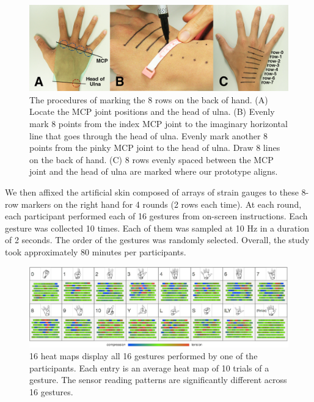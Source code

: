 \documentclass{sigchi}
\begin{document}
\begin{figure}
  \begin{center}
  \includegraphics[width=1\columnwidth]{figures/studyProcedure.jpg}
  \caption{The procedures of marking the 8 rows on the back of hand.
          (A) Locate the MCP joint positions and the head of ulna. 
          (B) Evenly mark 8 points from the index MCP joint to the imaginary horizontal line that goes through the head of ulna. Evenly mark another 8 points from the pinky MCP joint to the head of ulna. Draw 8 lines on the back of hand.
          (C) 8 rows evenly spaced between the MCP joint and the head of ulna are marked where our prototype aligns.
  }
  \label{fig:studyProcedure}
  \end{center}
\end{figure}

We then affixed the artificial skin composed of arrays of strain gauges to these 8-row markers on the right hand for 4 rounds (2 rows each time). At each round, each participant performed each of 16 gestures from on-screen instructions. Each gesture was collected 10 times. Each of them was sampled at 10 Hz in a duration of 2 seconds.
The order of the gestures was randomly selected. 
Overall, the study took approximately 80 minutes per participants.
\vspace{1cm}

\begin{figure}[t]
 \begin{center}
  \includegraphics[width=2\columnwidth]{figures/user16GesturesSV_v3.pdf}
  \caption{ 16 heat maps display all 16 gestures performed by one of the participants. Each entry is an average heat map of 10 trials of a gesture. The sensor reading patterns are significantly different across 16 gestures.
  }
  \label{fig:user16GesturesSV}
  \end{center}
\end{figure}
\end{document}
